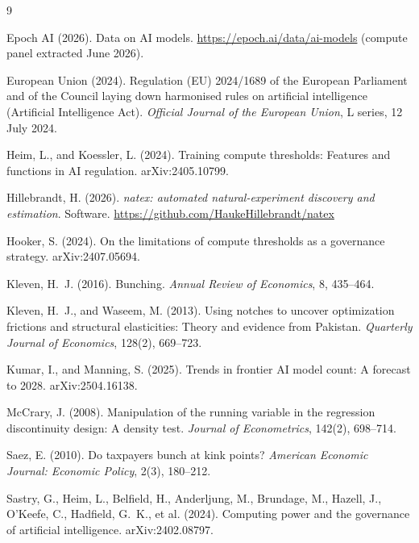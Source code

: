 \documentclass[11pt]{article}
\begin{document}
\footnotesize
\begin{thebibliography}{9}
\setlength{\itemsep}{1pt}\setlength{\parskip}{0pt}

Epoch AI (2026).
Data on AI models.
\url{https://epoch.ai/data/ai-models} (compute panel extracted June 2026).

European Union (2024).
Regulation (EU) 2024/1689 of the European Parliament and of the Council
laying down harmonised rules on artificial intelligence (Artificial
Intelligence Act).
\emph{Official Journal of the European Union}, L series, 12 July 2024.

Heim, L., and Koessler, L. (2024).
Training compute thresholds: Features and functions in AI regulation.
arXiv:2405.10799.

Hillebrandt, H. (2026).
\emph{natex: automated natural-experiment discovery and estimation}.
Software. \url{https://github.com/HaukeHillebrandt/natex}

Hooker, S. (2024).
On the limitations of compute thresholds as a governance strategy.
arXiv:2407.05694.

Kleven, H.~J. (2016).
Bunching.
\emph{Annual Review of Economics}, 8, 435--464.

Kleven, H.~J., and Waseem, M. (2013).
Using notches to uncover optimization frictions and structural elasticities:
Theory and evidence from Pakistan.
\emph{Quarterly Journal of Economics}, 128(2), 669--723.

Kumar, I., and Manning, S. (2025).
Trends in frontier AI model count: A forecast to 2028.
arXiv:2504.16138.

McCrary, J. (2008).
Manipulation of the running variable in the regression discontinuity design:
A density test.
\emph{Journal of Econometrics}, 142(2), 698--714.

Saez, E. (2010).
Do taxpayers bunch at kink points?
\emph{American Economic Journal: Economic Policy}, 2(3), 180--212.

Sastry, G., Heim, L., Belfield, H., Anderljung, M., Brundage, M., Hazell, J.,
O'Keefe, C., Hadfield, G.~K., et al. (2024).
Computing power and the governance of artificial intelligence.
arXiv:2402.08797.

\end{thebibliography}
\end{document}
